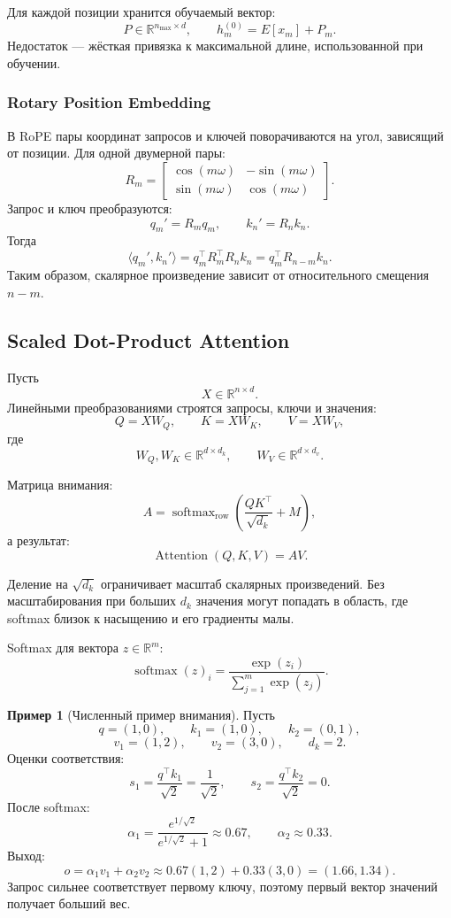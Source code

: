 \documentclass[12pt,a4paper]{article}
\DeclareMathOperator{\softmax}{softmax}
\newcommand{\R}{\mathbb{R}}
\newcommand{\1}{\mathbf{1}}
\theoremstyle{definition}
\newtheorem{example}[theorem]{Пример}
\theoremstyle{remark}
\begin{document}
Для каждой позиции хранится обучаемый вектор:
\[
P\in\R^{n_{\max}\times d},
\qquad
h_m^{(0)}=E[x_m]+P_m.
\]
Недостаток --- жёсткая привязка к максимальной длине, использованной
при обучении.

\subsubsection{Rotary Position Embedding}

В RoPE пары координат запросов и ключей поворачиваются на угол,
зависящий от позиции. Для одной двумерной пары:
\[
R_m=
\begin{bmatrix}
\cos(m\omega)&-\sin(m\omega)\\
\sin(m\omega)& \cos(m\omega)
\end{bmatrix}.
\]
Запрос и ключ преобразуются:
\[
q_m'=R_mq_m,\qquad k_n'=R_nk_n.
\]
Тогда
\[
\langle q_m',k_n'\rangle
=
q_m^\top R_m^\top R_n k_n
=
q_m^\top R_{n-m}k_n.
\]
Таким образом, скалярное произведение зависит от относительного смещения
$n-m$.

\subsection{Scaled Dot-Product Attention}

Пусть
\[
X\in\R^{n\times d}.
\]
Линейными преобразованиями строятся запросы, ключи и значения:
\[
Q=XW_Q,\qquad
K=XW_K,\qquad
V=XW_V,
\]
где
\[
W_Q,W_K\in\R^{d\times d_k},
\qquad
W_V\in\R^{d\times d_v}.
\]

Матрица внимания:
\[
A
=
\softmax_{\mathrm{row}}
\left(
\frac{QK^\top}{\sqrt{d_k}}+M
\right),
\]
а результат:
\[
\operatorname{Attention}(Q,K,V)=AV.
\]

Деление на $\sqrt{d_k}$ ограничивает масштаб скалярных произведений.
Без масштабирования при больших $d_k$ значения могут попадать в область,
где softmax близок к насыщению и его градиенты малы.

Softmax для вектора $z\in\R^m$:
\[
\softmax(z)_i
=
\frac{\exp(z_i)}
{\sum_{j=1}^{m}\exp(z_j)}.
\]

\begin{example}[Численный пример внимания]
Пусть
\[
q=(1,0),\qquad
k_1=(1,0),\qquad
k_2=(0,1),
\]
\[
v_1=(1,2),\qquad
v_2=(3,0),\qquad d_k=2.
\]
Оценки соответствия:
\[
s_1=\frac{q^\top k_1}{\sqrt{2}}=\frac{1}{\sqrt{2}},
\qquad
s_2=\frac{q^\top k_2}{\sqrt{2}}=0.
\]
После softmax:
\[
\alpha_1
=
\frac{e^{1/\sqrt{2}}}{e^{1/\sqrt{2}}+1}
\approx 0.67,
\qquad
\alpha_2\approx 0.33.
\]
Выход:
\[
o=\alpha_1v_1+\alpha_2v_2
\approx
0.67(1,2)+0.33(3,0)
=
(1.66,1.34).
\]
Запрос сильнее соответствует первому ключу, поэтому первый вектор
значений получает больший вес.
\end{example}
\end{document}
